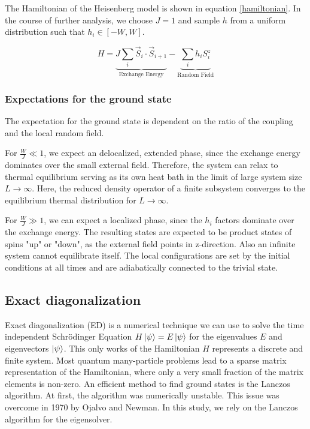 \documentclass[reprint,amsmath,amssymb,aps,prb]{revtex4-2}
\begin{document}
The Hamiltonian of the Heisenberg model is shown in equation \ref{hamiltonian}. In the course of further analysis, we choose $J=1$ and sample $h$ from a uniform distribution such that $h_i \in \left[-W, W\right]$.

\begin{equation}
	H=\underbrace{J\sum_i \vec{S}_i\cdot\vec{S}_{i+1}}_{\text{Exchange Energy}}-\underbrace{\sum_ih_iS_i^z}_{\text{Random Field}}\label{hamiltonian}
\end{equation}


\subsubsection{Expectations for the ground state}

The expectation for the ground state is dependent on the ratio of the coupling and the local random field. 

For $\frac{W}{J} \ll 1$, we expect an delocalized, extended phase, since the exchange energy dominates over the small external field. Therefore, the system can relax to thermal equilibrium serving as its own heat bath in the limit of large system size $L\rightarrow\infty$.
Here, the reduced density operator of a finite subsystem converges to the equilibrium thermal distribution
for $L\rightarrow\infty$.\cite{Pal2010}

For $\frac{W}{J} \gg 1$, we can expect a localized phase, since the $h_i$ factors dominate over the exchange energy. The resulting states are expected to be product states of spins "up" or "down", as the external field points in z-direction. Also an infinite system cannot equilibrate itself. The local configurations are set by the initial conditions at all times and are adiabatically connected to the trivial state.\cite{Pal2010}


\subsection{Exact diagonalization}

Exact diagonalization (ED) is a numerical technique we can use to solve the time independent Schrödinger Equation $H\ket{\psi}=E\ket{\psi}$ for the eigenvalues $E$ and eigenvectors $\ket{\psi}$. This only works of the Hamiltonian $H$ represents a discrete and finite system. Most quantum many-particle problems lead to a sparse matrix representation of the Hamiltonian, where only a very small fraction of the matrix
elements is non-zero.\cite{Weisse2008} An efficient method to find ground states is the Lanczos algorithm.\cite{Lanczos1950} At first, the algorithm was numerically unstable. This issue was overcome in 1970 by Ojalvo and Newman.\cite{Ojalvo1970} In this study, we rely on the Lanczos algorithm for the eigensolver.
\end{document}
